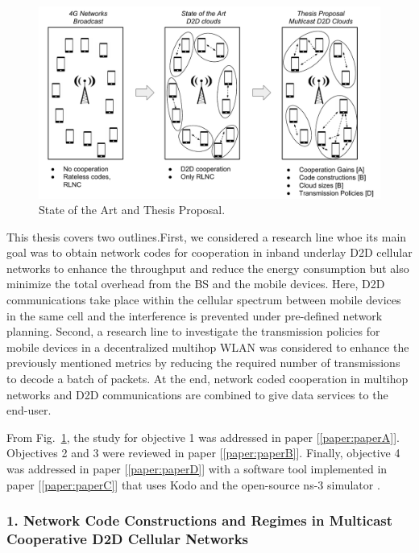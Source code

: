 \begin{figure}[h]
  \centering
  \includegraphics[width=\textwidth]{introduction/figures/thesis-diagrams.pdf}
  \caption{State of the Art and Thesis Proposal.}
\label{fig:proposal}
\end{figure}

This thesis covers two outlines.First, we considered a research line whoe its main goal was to obtain network codes for cooperation in inband underlay \ac{D2D} cellular networks to enhance the throughput and reduce the energy consumption but also minimize the total overhead from the \ac{BS} and the mobile devices. Here, \ac{D2D} communications take place within the cellular spectrum between mobile devices in the same cell and the interference is prevented under pre-defined network planning. Second, a research line to investigate the transmission policies for mobile devices in a decentralized multihop \ac{WLAN} was considered to enhance the previously mentioned metrics by reducing the required number of transmissions to decode a batch of packets. At the end, network coded cooperation in multihop networks and \ac{D2D} communications are combined to give data services to the end-user.

From Fig.~\ref{fig:proposal}, the study for objective 1 was addressed in paper {[\ref{paper:paperA}]}. Objectives 2 and 3 were reviewed in paper {[\ref{paper:paperB}]}. Finally, objective 4 was addressed in paper {[\ref{paper:paperD}]} with a software tool implemented in paper {[\ref{paper:paperC}]} that uses Kodo and the open-source ns-3 simulator \cite{ns3link}.

\subsubsection{1. Network Code Constructions and Regimes in Multicast Cooperative D2D Cellular Networks}

